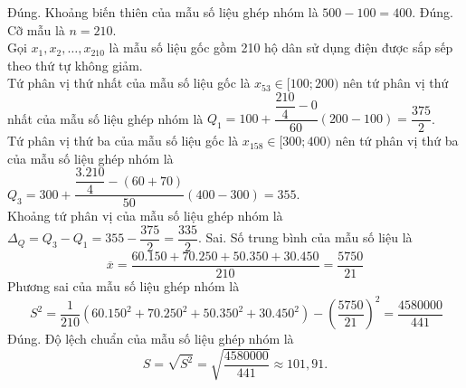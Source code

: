 \begin{ex}
{		\begin{itemchoice}
			\itemch Đúng. Khoảng biến thiên của mẫu số liệu ghép nhóm là $500-100=400$.
			\itemch Đúng. Cỡ mẫu là $n=210$.\\
			Gọi $x_1, x_2, \ldots, x_{210}$ là mẫu số liệu gốc gồm 210 hộ dân sử dụng điện được sắp sếp theo thứ tự không giảm. \\
			Tứ phân vị thứ nhất của mẫu số liệu gốc là $x_{53} \in[100; 200)$ nên tứ phân vị thứ nhất của mẫu số liệu ghép nhóm là $Q_1=100+\dfrac{\dfrac{210}{4}-0}{60}(200-100)=\dfrac{375}{2}$.\\
			Tứ phân vị thứ ba của mẫu số liệu gốc là $x_{158} \in[300; 400)$ nên tứ phân vị thứ ba của mẫu số liệu ghép nhóm là $Q_3=300+\dfrac{\dfrac{3.210}{4}-(60+70)}{50}(400-300)=355$.\\		
			Khoảng tứ phân vị của mẫu số liệu ghép nhóm là $\Delta_Q=Q_3-Q_1=355-\dfrac{375}{2}=\dfrac{335}{2}$.
			\itemch Sai. Số trung bình của mẫu số liệu là
			$$
			\overline{x}=\dfrac{60.150+70.250+50.350+30.450}{210}=\dfrac{5750}{21}
			$$
			Phương sai của mẫu số liệu ghép nhóm là
			$$\
			S^2=\dfrac{1}{210}\left(60.150^2+70.250^2+50.350^2+30.450^2\right)-\left(\dfrac{5750}{21}\right)^2=\dfrac{4580000}{441}
			$$
			\itemch Đúng. Độ lệch chuẩn của mẫu số liệu ghép nhóm là
			$$ S=\sqrt{S^2}=\sqrt{\dfrac{4580000}{441}} \approx 101,91.		$$
		\end{itemchoice}
	}
\end{ex}

